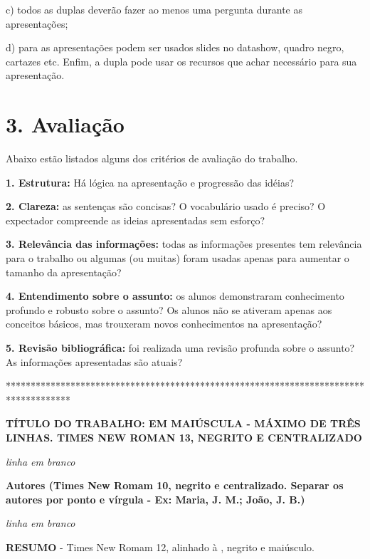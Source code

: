 \documentclass[a4paper,10pt]{article}
\begin{document}
    c) todos as duplas deverão fazer ao menos uma pergunta durante as apresentações;
    
    d) para as apresentações podem ser usados slides no datashow, quadro negro, cartazes etc. Enfim, a dupla pode usar os recursos que achar necessário para sua apresentação.
      
    
   \section* {3. Avaliação}
   \noindent

    Abaixo estão listados alguns dos critérios de avaliação do trabalho.

    \textbf{1. Estrutura:} Há lógica na apresentação e progressão das idéias?

    \textbf{2. Clareza:} as sentenças são concisas? O vocabulário usado é preciso? O expectador compreende as ideias apresentadas sem esforço?

     \textbf{3. Relevância das informações:} todas as informações presentes tem relevância para o trabalho ou algumas (ou muitas) foram usadas apenas para aumentar o tamanho da apresentação?

    \textbf{4. Entendimento sobre o assunto:} os alunos demonstraram conhecimento profundo e robusto sobre o assunto? Os alunos não se ativeram apenas aos conceitos básicos, mas trouxeram  novos conhecimentos na apresentação?
    
    \textbf {5. Revisão bibliográfica:} foi realizada uma revisão profunda sobre o assunto? As informações apresentadas são atuais? 
    

\vspace{10ex}

*************************************************************************************

  {\centering
  \textbf{TÍTULO DO TRABALHO: EM MAIÚSCULA - MÁXIMO DE TRÊS LINHAS. TIMES NEW ROMAN 13, NEGRITO E  CENTRALIZADO}

  \textit{linha em branco}

  \textbf{Autores (Times New Romam 10, negrito e centralizado. Separar os autores por ponto e vírgula - Ex: Maria, J. M.; João, J. B.)}

  \textit{linha em branco}

  \par
  }

  \noindent
  \textbf{RESUMO} - Times New Romam 12, alinhado à , negrito e maiúsculo.
\end{document}
